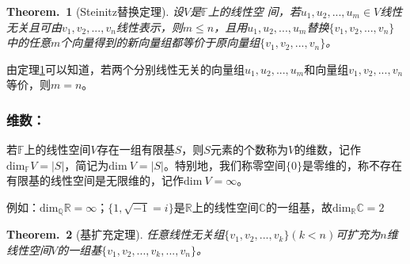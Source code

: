 \documentclass[zihao=-4,UTF8]{report}
\theoremstyle{mystyle} %
\newtheorem{theorem}{Theorem.\,}
\begin{document}
\begin{theorem}[Steinitz替换定理]\label{Steinitz替换定理}
    设$V$是$\mathbb{F}$上的线性空 间，若$u_1,u_2,...,u_m\in V$线性无关且可由$v_1,v_2,...,v_n$线性表示，则$m\le n$，且用$u_1,u_2,...,u_m$替换$\{v_1,v_2,...,v_n\}$中的任意$m$个向量得到的新向量组都等价于原向量组$\{v_1,v_2,...,v_n\}$。
\end{theorem}
{\color{gray}\small  由定理\ref{Steinitz替换定理}可以知道，若两个分别线性无关的向量组$u_1,u_2,...,u_m$和向量组$v_1,v_2,...,v_n$等价，则$m=n$。}
\subsubsection{维数：}
若$\mathbb{F}$上的线性空间$V$存在一组有限基$S$，则$S$元素的个数称为$V$的维数，记作$\text{dim}_{\mathbb{F}}V=|S|$，简记为$\text{dim}\ V=|S|$。特别地，我们称零空间$\{0\}$是零维的，称不存在有限基的线性空间是无限维的，记作$\text{dim}\ V = \infty$。\par
{\color{gray}\small 
例如：$\text{dim}_{\mathbb{Q}}\mathbb{R}= \infty$；$\{1,\sqrt{-1}=i\}$是$\mathbb{R}$上的线性空间$\mathbb{C}$的一组基，故$\text{dim}_{\mathbb{R}}\mathbb{C}=2$}

\begin{theorem}[基扩充定理]
    任意线性无关组$\{v_1,v_2,...,v_k\}(k<n)$可扩充为$n$维线性空间$V$的一组基$\{v_1,v_2,...,v_k,...,v_n\}$。
\end{theorem}
\end{document}
